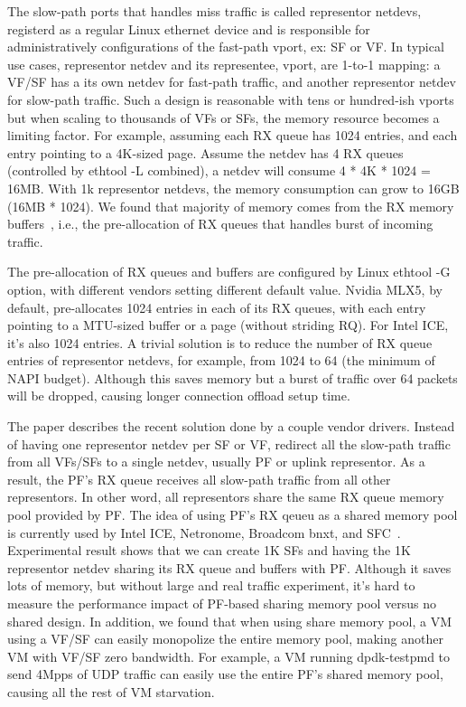 \documentclass[letterpaper]{article}
\begin{document}
The slow-path ports that handles miss traffic is called representor
netdevs, registerd as a regular Linux ethernet device and is responsible
for administratively configurations of the fast-path vport, ex: SF or VF.
In typical use cases, representor netdev and its representee, vport,
are 1-to-1 mapping: a VF/SF has a its own netdev for fast-path traffic,
and another representor netdev for slow-path traffic.
Such a design is reasonable with tens or hundred-ish vports but when scaling
to thousands of VFs or SFs, the memory resource becomes a limiting factor.
For example, assuming each RX queue has 1024 entries, and each entry
pointing to a 4K-sized page. Assume the netdev has 4 RX queues (controlled
by ethtool -L combined), a netdev will consume 4 * 4K * 1024 = 16MB.
With 1k representor netdevs, the memory consumption can grow
to 16GB (16MB * 1024). We found that majority of memory comes from
the RX memory buffers~\cite{jakub}, i.e., the pre-allocation of RX queues
that handles burst of incoming traffic.

The pre-allocation of RX queues and buffers are configured by Linux
ethtool -G option, with different vendors setting different default
value. Nvidia MLX5, by default, pre-allocates 1024 entries in each of
its RX queues, with each entry pointing to a MTU-sized buffer or a page
(without striding RQ). For Intel ICE, it's also 1024 entries. %
A trivial solution is to reduce the number of RX queue entries of
representor netdevs, for example, from 1024 to 64 (the minimum of NAPI
budget). Although this saves memory but a burst of traffic over 64 packets
will be dropped, causing longer connection offload setup time.

The paper describes the recent solution done by a couple vendor drivers.
Instead of having one representor netdev per SF or VF, redirect all
the slow-path traffic from all VFs/SFs to a single netdev, usually PF or
uplink representor. As a result, the PF's RX queue receives all slow-path
traffic from all other representors. In other word, all representors
share the same RX queue memory pool provided by PF. The idea of using PF's
RX qeueu as a shared memory pool is currently used by Intel ICE, Netronome,
Broadcom bnxt, and SFC~\cite{survey}.
Experimental result shows that we can create 1K SFs and having the 1K
representor netdev sharing its RX queue and buffers with PF. Although
it saves lots of memory, but without large and real traffic experiment,
it's hard to measure the performance impact of PF-based sharing memory
pool versus no shared design. In addition, we found that when using share
memory pool, a VM using a VF/SF can easily monopolize the entire memory
pool, making another VM with VF/SF zero bandwidth. For example, a VM
running dpdk-testpmd to send 4Mpps of UDP traffic can easily use the
entire PF's shared memory pool, causing all the rest of VM starvation.
\end{document}
